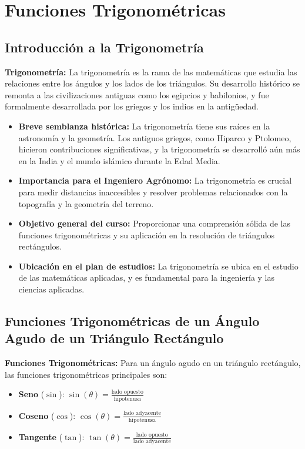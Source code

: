 \section{Funciones Trigonométricas} %

\subsection{Introducción a la Trigonometría}

\begin{definition}
    \textbf{Trigonometría:} La trigonometría es la rama de las matemáticas que estudia las relaciones entre los ángulos y los lados de los triángulos. Su desarrollo histórico se remonta a las civilizaciones antiguas como los egipcios y babilonios, y fue formalmente desarrollada por los griegos y los indios en la antigüedad.
\end{definition}

\begin{itemize}
    \item \textbf{Breve semblanza histórica:} La trigonometría tiene sus raíces en la astronomía y la geometría. Los antiguos griegos, como Hiparco y Ptolomeo, hicieron contribuciones significativas, y la trigonometría se desarrolló aún más en la India y el mundo islámico durante la Edad Media.
    \item \textbf{Importancia para el Ingeniero Agrónomo:} La trigonometría es crucial para medir distancias inaccesibles y resolver problemas relacionados con la topografía y la geometría del terreno.
    \item \textbf{Objetivo general del curso:} Proporcionar una comprensión sólida de las funciones trigonométricas y su aplicación en la resolución de triángulos rectángulos.
    \item \textbf{Ubicación en el plan de estudios:} La trigonometría se ubica en el estudio de las matemáticas aplicadas, y es fundamental para la ingeniería y las ciencias aplicadas.
\end{itemize}

\subsection{Funciones Trigonométricas de un Ángulo Agudo de un Triángulo Rectángulo}

\begin{definition}
    \textbf{Funciones Trigonométricas:} Para un ángulo agudo en un triángulo rectángulo, las funciones trigonométricas principales son:
    \begin{itemize}
        \item \textbf{Seno} (\(\sin\)): \(\sin(\theta) = \frac{\text{lado opuesto}}{\text{hipotenusa}}\)
        \item \textbf{Coseno} (\(\cos\)): \(\cos(\theta) = \frac{\text{lado adyacente}}{\text{hipotenusa}}\)
        \item \textbf{Tangente} (\(\tan\)): \(\tan(\theta) = \frac{\text{lado opuesto}}{\text{lado adyacente}}\)
    \end{itemize}
\end{definition}

